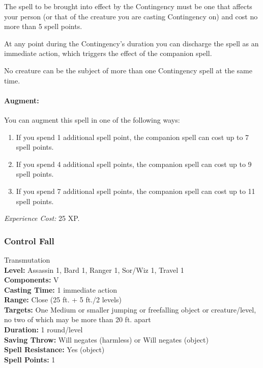 The spell to be brought into effect by the Contingency must be one that affects your person (or that of the creature you are casting Contingency on)
and cost no more than 5 spell points.

At any point during the Contingency's duration you can discharge the spell as an immediate action, which triggers the effect of the companion spell.

No creature can be the subject of more than one Contingency spell at the same time. 

\paragraph{Augment:} You can augment this spell in one of the following ways:
\begin{enumerate}
 \item If you spend 1 additional spell point, the companion spell can cost up to 7 spell points.
 \item If you spend 4 additional spell points, the companion spell can cost up to 9 spell points.
 \item If you spend 7 additional spell points, the companion spell can cost up to 11 spell points.
\end{enumerate}

\emph{Experience Cost:} 25 XP.
\subsubsection{Control Fall}
\label{Spell:ControlFall}
Transmutation
\\ \textbf{Level:} Assassin 1, Bard 1, Ranger 1, Sor/Wiz 1, Travel 1
\\ \textbf{Components:} V
\\ \textbf{Casting Time:} 1 immediate action
\\ \textbf{Range:} Close (25 ft. + 5 ft./2 levels)
\\ \textbf{Targets:} One Medium or smaller jumping or freefalling object or creature/level, no two of which may be more than 20 ft. apart
\\ \textbf{Duration:} 1 round/level
\\ \textbf{Saving Throw:} Will negates (harmless) or Will negates (object)
\\ \textbf{Spell Resistance:} Yes (object)
\\ \textbf{Spell Points:} 1

